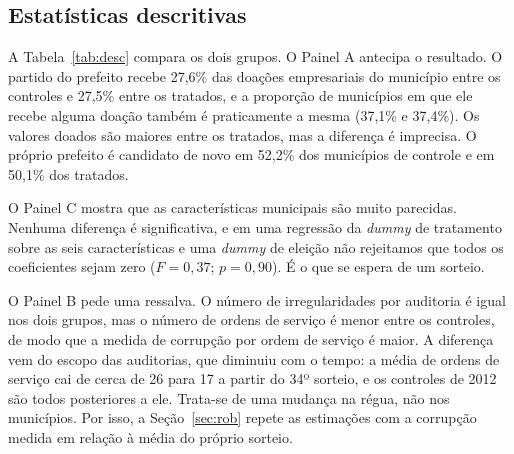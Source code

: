 \FloatBarrier
\subsection{Estatísticas descritivas}\label{sec:desc}

A Tabela~\ref{tab:desc} compara os dois grupos. O Painel A antecipa o resultado. O partido do prefeito
recebe 27,6\% das doações empresariais do município entre os controles e 27,5\% entre os tratados, e a
proporção de municípios em que ele recebe alguma doação também é praticamente a mesma (37,1\% e 37,4\%).
Os valores doados são maiores entre os tratados, mas a diferença é imprecisa. O próprio prefeito é
candidato de novo em 52,2\% dos municípios de controle e em 50,1\% dos tratados.

\begin{table}[!htb]
\centering
\caption{Estatísticas descritivas e balanceamento}\label{tab:desc}
\footnotesize

\end{table}

O Painel C mostra que as características municipais são muito parecidas. Nenhuma diferença é
significativa, e em uma regressão da \textit{dummy} de tratamento sobre as seis características e uma
\textit{dummy} de eleição não rejeitamos que todos os coeficientes sejam zero ($F=0{,}37$; $p=0{,}90$). É o
que se espera de um sorteio.

O Painel B pede uma ressalva. O número de irregularidades por auditoria é igual nos dois grupos, mas o
número de ordens de serviço é menor entre os controles, de modo que a medida de corrupção por ordem de
serviço é maior. A diferença vem do escopo das auditorias, que diminuiu com o tempo: a média de ordens de
serviço cai de cerca de 26 para 17 a partir do 34º sorteio, e os controles de 2012 são todos posteriores a
ele. Trata-se de uma mudança na régua, não nos municípios. Por isso, a Seção~\ref{sec:rob} repete as
estimações com a corrupção medida em relação à média do próprio sorteio.

